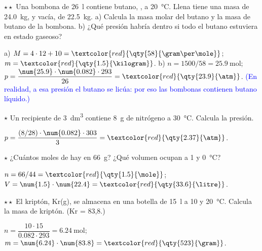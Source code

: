 \begin{exercise}
    \(\star\star\) Una bombona de \qty{26}{\litre} contiene butano, , a \qty{20}{\degreeCelsius}. Llena tiene una masa de
    \qty{24.0}{\kilogram}, y vacía, de \qty{22.5}{\kilogram}. a) Calcula la masa molar del butano y la masa de butano de la bombona.
    b) ¿Qué presión habría dentro si todo el butano estuviera en estado gaseoso?
    \begin{solu}
        a) \(M = 4 \cdot 12 + 10 = \textcolor{red}{\qty{58}{\gram\per\mole}}\); \(m = \textcolor{red}{\qty{1.5}{\kilogram}}\).
        b) \(n = 1500/58 = \qty{25.9}{\mole}\); \(p = \dfrac{\num{25.9} \cdot \num{0.082} \cdot 293}{26} = \textcolor{red}{\qty{23.9}{\atm}}\).
        \textcolor{blue}{(En realidad, a esa presión el butano se licúa: por eso las bombonas contienen butano líquido.)}
    \end{solu}
\end{exercise}

\begin{exercise}
    \(\star\) Un recipiente de \qty{3}{\cubic\deci\metre} contiene \qty{8}{\gram} de nitrógeno a \qty{30}{\degreeCelsius}. Calcula la presión.
    \begin{solu}
        \(p = \dfrac{(8/28) \cdot \num{0.082} \cdot 303}{3} = \textcolor{red}{\qty{2.37}{\atm}}\).
    \end{solu}
\end{exercise}

\begin{exercise}
    \(\star\) ¿Cuántos moles de  hay en \qty{66}{\gram}? ¿Qué volumen ocupan a \qty{1}{\atm} y \qty{0}{\degreeCelsius}?
    \begin{solu}
        \(n = 66/44 = \textcolor{red}{\qty{1.5}{\mole}}\); \(V = \num{1.5} \cdot \num{22.4} = \textcolor{red}{\qty{33.6}{\litre}}\).
    \end{solu}
\end{exercise}

\begin{exercise}
    \(\star\star\) El kriptón, Kr(g), se almacena en una botella de \qty{15}{\litre} a \qty{10}{\atm} y \qty{20}{\degreeCelsius}. Calcula la
    masa de kriptón. (Kr = 83,8.)
    \begin{solu}
        \(n = \dfrac{10 \cdot 15}{\num{0.082} \cdot 293} = \qty{6.24}{\mole}\); \(m = \num{6.24} \cdot \num{83.8} = \textcolor{red}{\qty{523}{\gram}}\).
    \end{solu}
\end{exercise}

